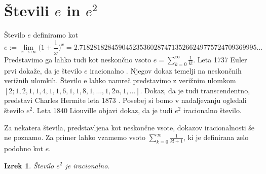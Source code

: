 \documentclass[a4paper]{article}
\theoremstyle{plain}
\newtheorem{izrek}{Izrek}
\begin{document}
\section*{Števili $e$ in $e^2$}

Število $e$ definiramo kot 
\begin{equation*}
e:=\lim_{x\to \infty}\bigg(1+\frac{1}{x}\bigg)^x = 2.71828182845904523536028747135266249775724709369995...
\end{equation*}
Predstavimo ga lahko tudi kot neskončno vsoto $ e = \sum_{k=0}^{\infty}\frac{1}{k!}$. Leta 1737 Euler prvi dokaže, da je število $e$ iracionalno \cite{knjiznica}. Njegov dokaz temelji na neskončnih verižnih ulomkih. Število e lahko namreč predstavimo z verižnim ulomkom $[2; 1, 2, 1, 1, 4, 1, 1, 6, 1, 1, 8, 1,\dots, 1, 2n, 1,\dots]$. Dokaz, da je tudi transcendentno, predstavi Charles Hermite leta 1873 \cite{e}. Posebej si bomo v nadaljevanju ogledali število $e^2$. Leta 1840 Liouville objavi dokaz, da je tudi $e^2$ iracionalno število.

Za nekatera števila, predstavljena kot neskončne vsote, dokazov iracionalnosti še ne poznamo. Za primer lahko vzamemo vsoto $\sum_{k=0}^{\infty}\frac{1}{k!+1}$, ki je definirana zelo podobno kot $e$. 

\begin{izrek}
Število $e^2$ je iracionalno.
\end{izrek}
\end{document}
